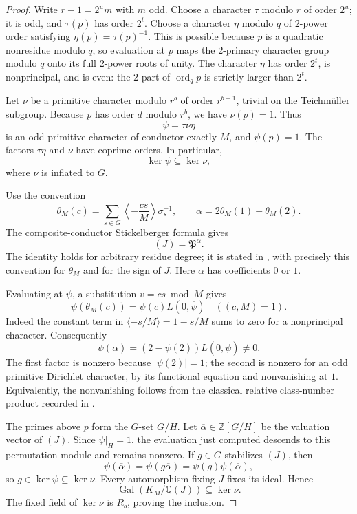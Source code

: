 \documentclass[11pt]{article}
\theoremstyle{definition}
\theoremstyle{remark}
\begin{document}
\begin{proof}
Write \(r-1=2^u m\) with \(m\) odd. Choose a character \(\tau\)
modulo \(r\) of order \(2^u\); it is odd, and \(\tau(p)\) has
order \(2^t\). Choose a character \(\eta\) modulo \(q\) of
\(2\)-power order satisfying
\(\eta(p)=\tau(p)^{-1}\).
This is possible because \(p\) is a quadratic nonresidue modulo
\(q\), so evaluation at \(p\) maps the \(2\)-primary character
group modulo \(q\) onto its full \(2\)-power roots of unity.
The character \(\eta\) has order \(2^t\), is nonprincipal, and
is even: the \(2\)-part of \(\operatorname{ord}_q p\) is strictly
larger than \(2^t\).

Let \(\nu\) be a primitive character modulo \(r^b\) of order
\(r^{b-1}\), trivial on the Teichm\"uller subgroup.
Because \(p\) has order \(d\) modulo \(r^b\), we have \(\nu(p)=1\).
Thus
\[
 \psi=\tau\nu\eta
\]
is an odd primitive character of conductor exactly \(M\), and
\(\psi(p)=1\). The factors \(\tau\eta\) and \(\nu\) have coprime
orders. In particular,
\begin{equation}\label{eq:cm-character-kernel}
 \ker\psi\subseteq\ker\nu,
\end{equation}
where \(\nu\) is inflated to \(G\).

Use the convention
\[
 \theta_M(c)=
 \sum_{s\in G}\left\langle-\frac{cs}{M}\right\rangle\sigma_s^{-1},
 \qquad \alpha=2\theta_M(1)-\theta_M(2).
\]
The composite-conductor Stickelberger formula gives
\[
 (J)=\mathfrak P^\alpha.
\]
The identity holds for arbitrary residue degree; it is stated in
\citet[Proposition~5.1, author p.~17, proof p.~18]
{BernardKucera2021}, with precisely this convention for
\(\theta_M\) and for the sign of \(J\).
Here \(\alpha\) has coefficients \(0\) or \(1\).

Evaluating at \(\psi\), a substitution \(v=cs\bmod M\) gives
\[
 \psi(\theta_M(c))
   =\psi(c)L(0,\overline\psi)
 \quad ((c,M)=1).
\]
Indeed the constant term in
\(\langle-s/M\rangle=1-s/M\) sums to zero for a nonprincipal
character. Consequently
\[
 \psi(\alpha)=(2-\psi(2))L(0,\overline\psi)\ne0.
\]
The first factor is nonzero because \(|\psi(2)|=1\); the second
is nonzero for an odd primitive Dirichlet character, by its
functional equation and nonvanishing at \(1\).
Equivalently, the nonvanishing follows from the classical
relative class-number product recorded in
\citet[equation~(31), author p.~18]{BernardKucera2021}.

The primes above \(p\) form the \(G\)-set \(G/H\).
Let \(\overline\alpha\in\mathbb Z[G/H]\) be the valuation vector
of \((J)\). Since \(\psi|_H=1\), the evaluation just computed
descends to this permutation module and remains nonzero.
If \(g\in G\) stabilizes \((J)\), then
\[
 \psi(\overline\alpha)
 =\psi(g\overline\alpha)
 =\psi(g)\psi(\overline\alpha),
\]
so \(g\in\ker\psi\subseteq\ker\nu\).
Every automorphism fixing \(J\) fixes its ideal. Hence
\[
 \operatorname{Gal}(K_M/\mathbb Q(J))
 \subseteq\ker\nu.
\]
The fixed field of \(\ker\nu\) is \(R_b\), proving the inclusion.


\end{proof}
\end{document}
